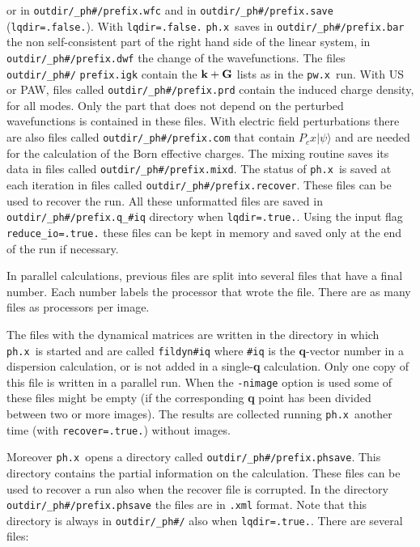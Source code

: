 \documentclass[12pt,a4paper]{article}
\def\pwx{\texttt{pw.x}}
\def\phx{\texttt{ph.x}}
\begin{document}
or in \texttt{outdir/\_ph\#/{prefix}.wfc} and in 
\texttt{outdir/\_ph\#/{prefix}.save} (\texttt{lqdir=.false.}). With
\texttt{lqdir=.false.} \phx\ saves in 
\texttt{outdir/\_ph\#/{prefix}.bar} the
non self-consistent part of the right hand side of the linear system, 
in \texttt{outdir/\_ph\#/{prefix}.dwf} the change of the wavefunctions. 
The files \texttt{outdir/\_ph\#/} \texttt{{prefix}.igk} contain the ${\bf k}+{\bf G}$ 
lists as in the \pwx\ run.
With US or PAW, files called \texttt{outdir/\_ph\#/{prefix}.prd} 
contain the induced charge density, for all modes. 
Only the part that does not depend on the perturbed wavefunctions 
is contained in these files. With electric field perturbations 
there are also files called \texttt{outdir/\_ph\#/{prefix}.com} that 
contain $P_c x |\psi\rangle$ and are needed for the calculation 
of the Born effective charges.
The mixing routine saves its data in files called 
\texttt{outdir/\_ph\#/{prefix}.mixd}. 
The status of \phx\ is saved at each iteration in files called
\texttt{outdir/\_ph\#/{prefix}.recover}. These files can be used 
to recover the run. All these unformatted files are saved in 
\texttt{outdir/\_ph\#/prefix.q\_\#iq} directory when \texttt{lqdir=.true.}.
Using the input flag \texttt{reduce\_io=.true.} these files can be
kept in memory and saved only at the end of the run if necessary.

In parallel calculations, previous files are split into several files 
that have a final number. Each number labels the processor that wrote the 
file. There are as many files as processors per image. 

The files with the dynamical matrices are written in the directory in
which \phx\ is started and are called \texttt{{fildyn}\#iq} where 
\texttt{\#iq} is the {\bf q}-vector number in a dispersion calculation, 
or is not added in a single-{\bf q} calculation. Only one copy of this 
file is written in a parallel run. When the \texttt{-nimage} option
is used some of these files might be empty (if the corresponding {\bf q}
point has been divided between two or more images). The results are
collected running \phx\ another time (with \texttt{recover=.true.})
without images.

Moreover \phx\ opens a directory called \texttt{outdir/\_ph\#/{prefix}.phsave}.
This directory contains the partial information on the calculation.
These files can be used to recover a run also when the recover file 
is corrupted. In the directory {\tt outdir/\_ph\#/{prefix}.phsave} the 
files are in \texttt{.xml} format. Note that this directory is
always in \texttt{outdir/\_ph\#/} also when \texttt{lqdir=.true.}.
There are several files:
\end{document}
